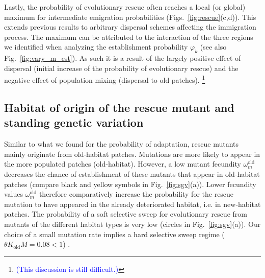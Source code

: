 \documentclass[a4paper,11pt]{article}
\newcommand{\francois}[1]{\textcolor{blue}{(#1)}}
\newcommand{\chg}[1]{\textcolor{change}{#1}}
\begin{document}
Lastly, the probability of evolutionary rescue often reaches a local (or global) maximum for intermediate emigration probabilities (Figs.~\ref{fig:rescue}(c,d)). This extends previous results \citep{uecker_2014,tomasini_2019} to arbitrary dispersal schemes affecting the immigration process. The maximum can be attributed to the interaction of the three regions we identified when analyzing the establishment probability $\varphi_k$ (see also Fig.~\ref{fig:vary_m_est}). As such it is a result of the largely positive effect of dispersal (initial increase of the probability of evolutionary rescue) and the negative effect of population mixing \chg{(dispersal to old patches)}. \footnote{\francois{This discussion is still difficult.}}

\subsection*{Habitat of origin of the rescue mutant and standing genetic variation}
Similar to what \chg{we} found for the probability of adaptation, rescue mutants mainly originate from old-habitat patches. Mutations are more likely to appear in the more populated patches (old-habitat). However, a low mutant fecundity $\omega^\text{old}_m$ decreases the chance of establishment of these mutants that appear in old-habitat patches (compare black and yellow symbols in Fig.~\ref{fig:sgv}(a)). Lower fecundity values $\omega^\text{old}_m$ therefore comparatively increase the probability for the rescue mutation to have appeared in the already deteriorated habitat, i.e. in new-habitat patches. \chg{The probability of a soft selective sweep for evolutionary rescue from mutants of the different habitat types is very low (circles in Fig.~\ref{fig:sgv}(a)). Our choice of a small mutation rate implies a hard selective sweep regime ($\theta K_{\text{old}} M = 0.08<1$) \citep{wilson_2018,hermisson_2017}. }
\end{document}
